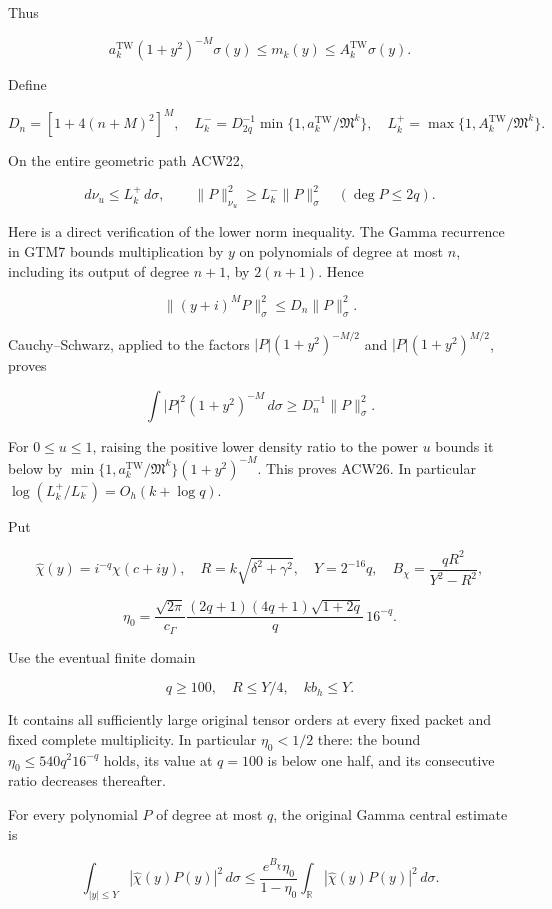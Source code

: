 Thus

\[
a_k^{\mathrm{TW}}(1+y^2)^{-M}\sigma(y)
\le m_k(y)\le A_k^{\mathrm{TW}}\sigma(y).
\]

Define

\[
D_n=[1+4(n+M)^2]^M,
\quad
L_k^- = D_{2q}^{-1}\min\{1,a_k^{\mathrm{TW}}/\mathfrak M^k\},
\quad
L_k^+ = \max\{1,A_k^{\mathrm{TW}}/\mathfrak M^k\}.
\tag{ACW25}
\]

On the entire geometric path ACW22,

\[
d\nu_u\le L_k^+\,d\sigma,
\qquad
\|P\|_{\nu_u}^2\ge L_k^-\|P\|_\sigma^2
\quad(\deg P\le2q).
\tag{ACW26}
\]

Here is a direct verification of the lower norm inequality. The Gamma recurrence in GTM7 bounds multiplication by \(y\) on polynomials of degree at most \(n\), including its output of degree \(n+1\), by \(2(n+1)\). Hence

\[
\|(y+i)^M P\|_\sigma^2\le D_n\|P\|_\sigma^2.
\]

Cauchy--Schwarz, applied to the factors \(|P|(1+y^2)^{-M/2}\) and \(|P|(1+y^2)^{M/2}\), proves

\[
\int|P|^2(1+y^2)^{-M}\,d\sigma\ge D_n^{-1}\|P\|_\sigma^2.
\]

For \(0\le u\le1\), raising the positive lower density ratio to the power \(u\) bounds it below by
\(\min\{1,a_k^{\mathrm{TW}}/\mathfrak M^k\}(1+y^2)^{-M}\).
This proves ACW26. In particular
\(\log(L_k^+/L_k^-)=O_h(k+\log q)\).

Put

\[
\widehat\chi(y)=i^{-q}\chi(c+iy),\quad
R=k\sqrt{\delta^2+\gamma^2},\quad
Y=2^{-16}q,\quad
B_\chi=\frac{qR^2}{Y^2-R^2},
\]

\[
\eta_0=
\frac{\sqrt{2\pi}}{c_\Gamma}
\frac{(2q+1)(4q+1)\sqrt{1+2q}}q\,16^{-q}.
\tag{ACW27}
\]

Use the eventual finite domain

\[
q\ge100,\quad R\le Y/4,\quad kb_h\le Y.
\]

It contains all sufficiently large original tensor orders at every fixed packet and fixed complete multiplicity. In particular \(\eta_0<1/2\) there: the bound \(\eta_0\le540q^2 16^{-q}\) holds, its value at \(q=100\) is below one half, and its consecutive ratio decreases thereafter.

For every polynomial \(P\) of degree at most \(q\), the original Gamma central estimate is

\[
\int_{|y|\le Y}|\widehat\chi(y)P(y)|^2\,d\sigma
\le
\frac{e^{B_\chi}\eta_0}{1-\eta_0}
\int_{\mathbb R}|\widehat\chi(y)P(y)|^2\,d\sigma.
\tag{ACW28}
\]

